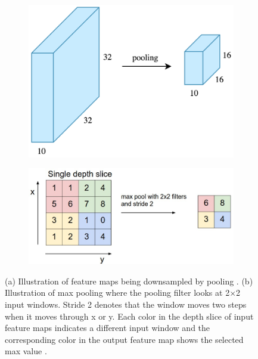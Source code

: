 	\begin{figure}[h]
	\centering
		\begin{subfigure}{.35\textwidth}
  			\centering
  			\includegraphics[width=1\linewidth]{images/pooling}
  			\caption{}
  			\label{Fig:poolb}
		\end{subfigure}
		\begin{subfigure}{.55\textwidth}
  			\centering
  			\includegraphics[width=1\linewidth]{images/maxpool}
  			\caption{}
  			\label{Fig:poola}
		\end{subfigure}
		\caption{(a) Illustration of feature maps being downsampled by pooling \cite{towardsdatascience}. (b) Illustration of max pooling where the pooling filter looks at 2$\times$2 input windows. Stride 2 denotes that the window moves two steps when it moves through x or y. Each color in the depth slice of input feature maps indicates a different input window and the corresponding color in the output feature map shows the selected max value \cite{cs231n}.}
		\label{Fig:pool}
	\end{figure}	


